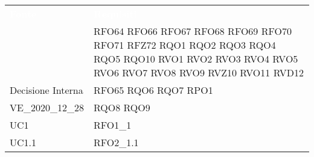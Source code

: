\renewcommand{\arraystretch}{1.5}


\begin{longtable}{|C{6cm} C{6cm}|} 
	
	\textcolor{white}{\textbf{Fonte}}&
	\textcolor{white}{\textbf{Requisiti}}\\	

	 & RFO64 \newline RFO66 \newline RFO67 \newline RFO68 \newline RFO69 \newline RFO70 \newline RFO71 \newline RFZ72 \newline RQO1 \newline RQO2 \newline RQO3 \newline RQO4 \newline RQO5 \newline RQO10 \newline RVO1 \newline RVO2 \newline RVO3 \newline RVO4 \newline RVO5 \newline RVO6 \newline RVO7 \newline RVO8 \newline RVO9 \newline RVZ10 \newline RVO11 \newline RVD12 \\
	
	Decisione Interna & RFO65 \newline RQO6 \newline RQO7 \newline RPO1  \\
	
	VE\_2020\_12\_28 & RQO8 \newline RQO9  \\

	UC1 & RFO1\_1 \\

	UC1.1 & RFO2\_1.1 \\
	

\end{longtable}
